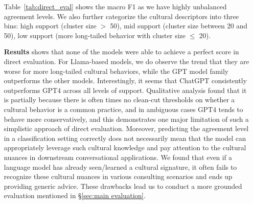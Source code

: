 \documentclass{article} %
\newcommand{\ryan}[1]{\textcolor{magenta}{[#1 --Ryan]}}
\newcommand{\dataname}{\textit{CultureBank}\xspace}
\begin{document}

Table~\ref{tab:direct_eval} shows the macro F1 as we have highly unbalanced agreement levels. We also further categorize the cultural descriptors into three bins: high support (cluster size $>$ 50), mid support (cluster size between 20 and 50), low support (more long-tailed behavior with cluster size $\leq$ 20). 

\textbf{Results} shows that none of the models were able to achieve a perfect score in direct evaluation.  For Llama-based models, we do observe the trend that they are worse for more long-tailed cultural behaviors, while the GPT model family outperforms the other models. Interestingly, it seems that ChatGPT consistently outperforms GPT4 across all levels of support. Qualitative analysis found that it is partially because there is often times no clean-cut thresholds on whether a cultural behavior is a common practice, and in ambiguous cases GPT4 tends to behave more conservatively, and this demonstrates one major limitation of such a simplistic approach of direct evaluation. Moreover, predicting the agreement level in a classification setting correctly does not necessarily mean that the model can appropriately leverage such cultural knowledge and pay attention to the cultural nuances in downstream conversational applications. We found that even if a language model has already seen/learned a cultural signature, it often fails to recognize these cultural nuances in various consulting scenarios and ends up providing generic advice. These drawbacks lead us to conduct a more grounded evaluation mentioned in \S\ref{sec:main evaluation}.
\end{document}
